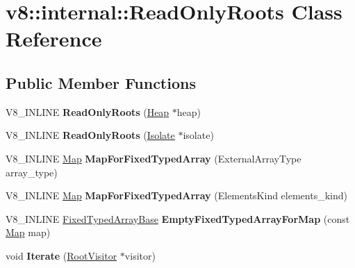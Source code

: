 \hypertarget{classv8_1_1internal_1_1ReadOnlyRoots}{}\section{v8\+:\+:internal\+:\+:Read\+Only\+Roots Class Reference}
\label{classv8_1_1internal_1_1ReadOnlyRoots}
\subsection*{Public Member Functions}
\begin{DoxyCompactItemize}
\item 
\mbox{\label{classv8_1_1internal_1_1ReadOnlyRoots_ae9428cf8675efd0c3cb92eab575418db}} 
V8\+\_\+\+I\+N\+L\+I\+NE {\bfseries Read\+Only\+Roots} (\mbox{\hyperlink{classv8_1_1internal_1_1Heap}{Heap}} $\ast$heap)
\item 
\mbox{\label{classv8_1_1internal_1_1ReadOnlyRoots_ae96f04a503c4fad6054eac517023be01}} 
V8\+\_\+\+I\+N\+L\+I\+NE {\bfseries Read\+Only\+Roots} (\mbox{\hyperlink{classv8_1_1internal_1_1Isolate}{Isolate}} $\ast$isolate)
\item 
\mbox{\label{classv8_1_1internal_1_1ReadOnlyRoots_acd1aead53622b924ba88a63c00980c39}} 
V8\+\_\+\+I\+N\+L\+I\+NE \mbox{\hyperlink{classv8_1_1internal_1_1Map}{Map}} {\bfseries Map\+For\+Fixed\+Typed\+Array} (External\+Array\+Type array\+\_\+type)
\item 
\mbox{\label{classv8_1_1internal_1_1ReadOnlyRoots_a6ea7241cd03a6f495388629e81a1469a}} 
V8\+\_\+\+I\+N\+L\+I\+NE \mbox{\hyperlink{classv8_1_1internal_1_1Map}{Map}} {\bfseries Map\+For\+Fixed\+Typed\+Array} (Elements\+Kind elements\+\_\+kind)
\item 
\mbox{\label{classv8_1_1internal_1_1ReadOnlyRoots_a2ec7e636e086b913ea560f6210cf542d}} 
V8\+\_\+\+I\+N\+L\+I\+NE \mbox{\hyperlink{classv8_1_1internal_1_1FixedTypedArrayBase}{Fixed\+Typed\+Array\+Base}} {\bfseries Empty\+Fixed\+Typed\+Array\+For\+Map} (const \mbox{\hyperlink{classv8_1_1internal_1_1Map}{Map}} map)
\item 
\mbox{\label{classv8_1_1internal_1_1ReadOnlyRoots_a82b6d682c7eae9e00dd36524af1f6622}} 
void {\bfseries Iterate} (\mbox{\hyperlink{classv8_1_1internal_1_1RootVisitor}{Root\+Visitor}} $\ast$visitor)
\end{DoxyCompactItemize}


